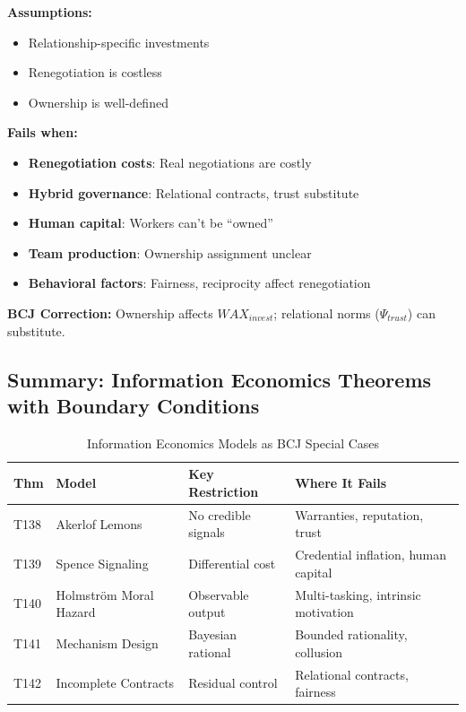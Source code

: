 \begin{tcolorbox}[colback=red!5!white, colframe=red!75!black, title=Boundary Condition: Where Incomplete Contracts Fail]
\textbf{Assumptions:}
\begin{itemize}[nosep]
\item Relationship-specific investments
\item Renegotiation is costless
\item Ownership is well-defined
\end{itemize}

\textbf{Fails when:}
\begin{itemize}[nosep]
\item \textbf{Renegotiation costs}: Real negotiations are costly
\item \textbf{Hybrid governance}: Relational contracts, trust substitute
\item \textbf{Human capital}: Workers can't be ``owned''
\item \textbf{Team production}: Ownership assignment unclear
\item \textbf{Behavioral factors}: Fairness, reciprocity affect renegotiation
\end{itemize}

\textbf{BCJ Correction:} Ownership affects $WAX_{invest}$; relational norms ($\Psi_{trust}$) can substitute.
\end{tcolorbox}

\subsection{Summary: Information Economics Theorems with Boundary Conditions}

\begin{table}[htbp]
\centering
\caption{Information Economics Models as BCJ Special Cases}
\label{tab:info-econ-boundaries}
\renewcommand{\arraystretch}{1.2}
\begin{tabular}{@{}llp{3.5cm}p{4cm}@{}}
\toprule
\textbf{Thm} & \textbf{Model} & \textbf{Key Restriction} & \textbf{Where It Fails} \\
\midrule
T138 & Akerlof Lemons & No credible signals & Warranties, reputation, trust \\
T139 & Spence Signaling & Differential cost & Credential inflation, human capital \\
T140 & Holmström Moral Hazard & Observable output & Multi-tasking, intrinsic motivation \\
T141 & Mechanism Design & Bayesian rational & Bounded rationality, collusion \\
T142 & Incomplete Contracts & Residual control & Relational contracts, fairness \\
\bottomrule
\end{tabular}
\end{table}


